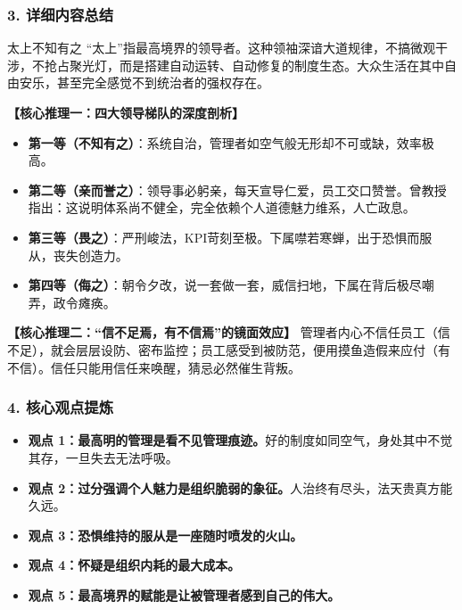 \subsubsection{3. 详细内容总结}

\begin{ConceptBox}{太上不知有之}
“太上”指最高境界的领导者。这种领袖深谙大道规律，不搞微观干涉，不抢占聚光灯，而是搭建自动运转、自动修复的制度生态。大众生活在其中自由安乐，甚至完全感觉不到统治者的强权存在。
\end{ConceptBox}

\noindent\textbf{【核心推理一：四大领导梯队的深度剖析】}
\begin{itemize}
    \item \textbf{第一等（不知有之）}：系统自治，管理者如空气般无形却不可或缺，效率极高。
    \item \textbf{第二等（亲而誉之）}：领导事必躬亲，每天宣导仁爱，员工交口赞誉。曾教授指出：这说明体系尚不健全，完全依赖个人道德魅力维系，人亡政息。
    \item \textbf{第三等（畏之）}：严刑峻法，KPI苛刻至极。下属噤若寒蝉，出于恐惧而服从，丧失创造力。
    \item \textbf{第四等（侮之）}：朝令夕改，说一套做一套，威信扫地，下属在背后极尽嘲弄，政令瘫痪。
\end{itemize}

\noindent\textbf{【核心推理二：“信不足焉，有不信焉”的镜面效应】}
管理者内心不信任员工（信不足），就会层层设防、密布监控；员工感受到被防范，便用摸鱼造假来应付（有不信）。信任只能用信任来唤醒，猜忌必然催生背叛。

\subsubsection{4. 核心观点提炼}
\begin{itemize}
    \item \textbf{观点 1：最高明的管理是看不见管理痕迹。}好的制度如同空气，身处其中不觉其存，一旦失去无法呼吸。
    \item \textbf{观点 2：过分强调个人魅力是组织脆弱的象征。}人治终有尽头，法天贵真方能久远。
    \item \textbf{观点 3：恐惧维持的服从是一座随时喷发的火山。}
    \item \textbf{观点 4：怀疑是组织内耗的最大成本。}
    \item \textbf{观点 5：最高境界的赋能是让被管理者感到自己的伟大。}
\end{itemize}

